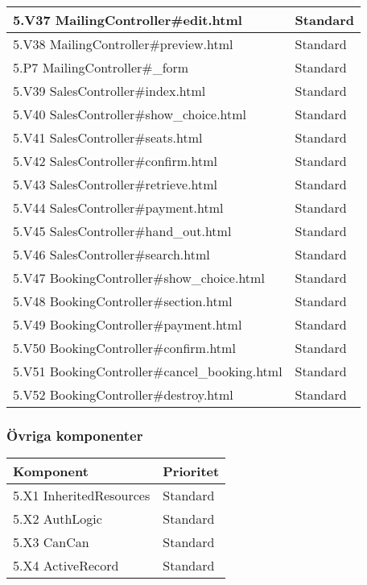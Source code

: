 \documentclass[a4paper, twoside, 11pt, titlepage]{article}
\begin{document}
\begin {table} [ht]
\begin{tabular} {  p{4cm} p{2cm} }
			\hline
			{ 5.V37 MailingController\#edit.html } & { Standard } \\
			\hline
			{ 5.V38 MailingController\#preview.html } & { Standard } \\
			\hline
			{ 5.P7 MailingController\#\_form } & { Standard } \\
			\hline
			{ 5.V39 SalesController\#index.html } & { Standard } \\
			\hline
			{ 5.V40 SalesController\#show\_choice.html } & { Standard } \\
			\hline
			{ 5.V41 SalesController\#seats.html } & { Standard } \\
			\hline
			{ 5.V42 SalesController\#confirm.html } & { Standard } \\
			\hline
			{ 5.V43 SalesController\#retrieve.html } & { Standard } \\
			\hline
			{ 5.V44 SalesController\#payment.html } & { Standard } \\
			\hline
			{ 5.V45 SalesController\#hand\_out.html } & { Standard } \\
			\hline
			{ 5.V46 SalesController\#search.html } & { Standard } \\
			\hline
			{ 5.V47 BookingController\#show\_choice.html } & { Standard } \\
			\hline
			{ 5.V48 BookingController\#section.html } & { Standard } \\
			\hline
			{ 5.V49 BookingController\#payment.html } & { Standard } \\
			\hline
			{ 5.V50 BookingController\#confirm.html } & { Standard } \\
			\hline
			{ 5.V51 BookingController\#cancel\_booking.html } & { Standard } \\
			\hline
			{ 5.V52 BookingController\#destroy.html } & { Standard } \\
			\hline
		\end{tabular} \end{table} \FloatBarrier


		\subsubsection{Övriga komponenter}


		\begin {table} [ht] \begin{tabular} {  p{4cm} p{2cm} }
			\hline
			{ Komponent } & { Prioritet } \\
			\hline
			{ 5.X1 InheritedResources} & { Standard } \\
			\hline
			{ 5.X2 AuthLogic } & { Standard } \\
			\hline
			{ 5.X3 CanCan} & { Standard } \\
			\hline
			{ 5.X4 ActiveRecord} & { Standard } \\
			\hline
		\end{tabular} \end{table} \FloatBarrier
\end{document}
